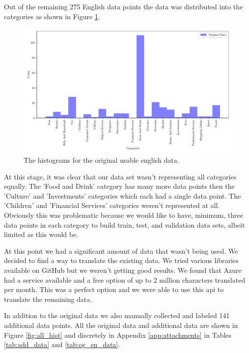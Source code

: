 Out of the remaining 275 English data points the data was distributed into the categories as shown in Figure \ref{fig:og_en_hist}.

\begin{figure}[!ht]
  \centering
  \includegraphics[width=\textwidth]{../img/plot_og_en_hist.pdf}
  \caption{The histograms for the original usable english data.}
  \label{fig:og_en_hist}
\end{figure}

At this stage, it was clear that our data set wasn't representing all categories equally. The 'Food and Drink' category has many more data points then the 'Culture' and 'Investments' categories which each had a single data point. The 'Children' and 'Financial Services' categories weren't represented at all. Obviously this was problematic because we would like to have, minimum, three data points in each category to build train, test, and validation data sets, albeit limited as this would be.

At this point we had a significant amount of data that wasn't being used. We decided to find a way to translate the existing data. We tried various libraries available on GitHub but we weren't getting good results. We found that Azure had a service available and a free option of up to 2 million characters translated per month. This was a perfect option and we were able to use this api to translate the remaining data.

In addition to the original data we also manually collected and labeled 141 additional data points. All the original data and additional data are shown in Figure \ref{fig:all_hist} and discretely in Appendix \ref{app:attachments} in Tables \ref{tab:add_data} and \ref{tab:og_en_data}.



